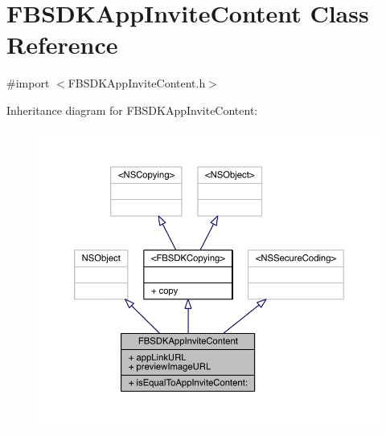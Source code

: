\hypertarget{interface_f_b_s_d_k_app_invite_content}{\section{F\-B\-S\-D\-K\-App\-Invite\-Content Class Reference}
\label{interface_f_b_s_d_k_app_invite_content}
}


{\ttfamily \#import $<$F\-B\-S\-D\-K\-App\-Invite\-Content.\-h$>$}



Inheritance diagram for F\-B\-S\-D\-K\-App\-Invite\-Content\-:
\nopagebreak
\begin{figure}[H]
\begin{center}
\leavevmode
\includegraphics[width=350pt]{interface_f_b_s_d_k_app_invite_content__inherit__graph}
\end{center}
\end{figure}


